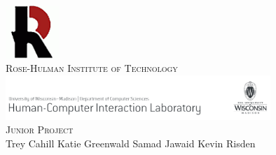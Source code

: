 \documentclass{article}
\begin{document}
\begin{titlepage}
\begin{center}
\includegraphics[width=0.15\textwidth]{../images/rh}\\[1.0cm]
\textsc{\large Rose-Hulman Institute of Technology}\\[1.5cm]
\includegraphics[width=0.75\textwidth]{../images/pss}\\[1.0cm]
\textsc{\large Junior Project}\\[1.0cm]
\large Trey Cahill \hspace{0.2cm} Katie Greenwald \hspace{0.2cm} Samad Jawaid \hspace{0.2cm} Kevin Risden
\end{center}
\end{titlepage}
\end{document}
